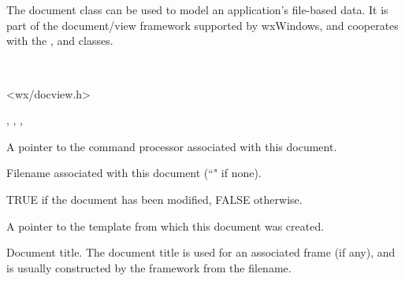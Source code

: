 \section{}\label{wxdocument}

The document class can be used to model an application's file-based
data. It is part of the document/view framework supported by wxWindows,
and cooperates with the , \rtfsp
and  classes.


\\


<wx/docview.h>


, ,\rtfsp
{}, 




A pointer to the command processor associated with this document.



Filename associated with this document (``" if none).



TRUE if the document has been modified, FALSE otherwise.



A pointer to the template from which this document was created.



Document title. The document title is used for an associated
frame (if any), and is usually constructed by the framework from
the filename.

